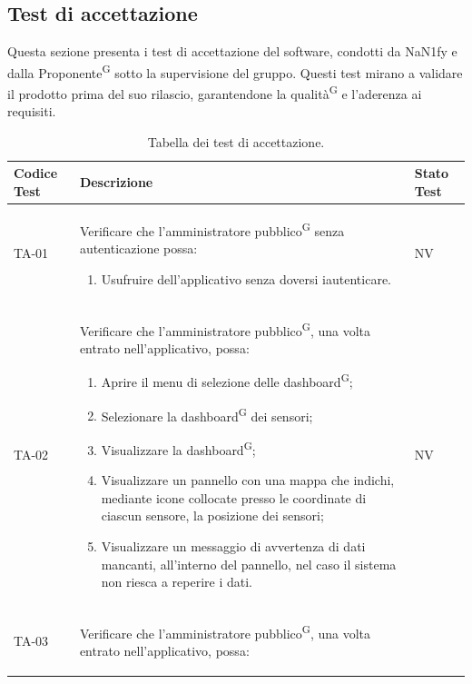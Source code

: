 \documentclass[8pt]{article}
\newcommand{\glossterm}[1]{#1\textsuperscript{G}} %
\begin{document}
\subsection{Test di accettazione}
Questa sezione presenta i test di accettazione del software, condotti da NaN1fy e dalla
\glossterm{Proponente} sotto la supervisione del gruppo. Questi test mirano a validare il prodotto prima del suo rilascio, garantendone la \glossterm{qualità} e l'aderenza ai requisiti.

\renewcommand{\arraystretch}{2.5}
\begin{longtable}{|>{\centering}p{2cm}|>{\RaggedRight}m{12cm}|>{\centering\arraybackslash}p{2cm}|}
    \hline
    \rowcolor{white}
    \textbf{Codice Test} & \textbf{Descrizione} & \textbf{Stato Test} \\
    \hline
    \endfirsthead 
    \rowcolor{white}
    \caption{Tabella dei test di accettazione.} 
    \label{table:Tabella dei test di accettazione}
    \endlastfoot  
    TA-01 & Verificare che l’\glossterm{amministratore pubblico} senza autenticazione possa:
    \begin{enumerate}
        \setlength\itemsep{0em}
        \item Usufruire dell’applicativo senza doversi iautenticare.
    \end{enumerate} & NV \\
    \hline
    TA-02 & Verificare che l’\glossterm{amministratore pubblico}, una volta entrato nell'applicativo, possa:
    \begin{enumerate}
        \setlength\itemsep{0em}
        \item Aprire il menu di selezione delle \glossterm{dashboard};
        \item Selezionare la \glossterm{dashboard} dei sensori;
        \item Visualizzare la \glossterm{dashboard};
        \item Visualizzare un pannello con una mappa che indichi, mediante icone collocate presso le coordinate di ciascun sensore, la posizione dei sensori;
        \item Visualizzare un messaggio di avvertenza di dati mancanti, all’interno del pannello, nel caso il sistema non riesca a reperire i dati.
    \end{enumerate}
    & NV \\
    \hline
    TA-03 & Verificare che l’\glossterm{amministratore pubblico}, una volta entrato nell'applicativo, possa:
    \begin{enumerate}

\end{enumerate}
\end{longtable}
\end{document}

